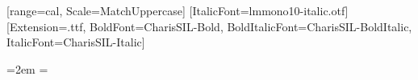 \usepackage[sups,otfmath]{XCharter} %
[range=cal, Scale=MatchUppercase] %
\setmonofont{lmmono10-regular.otf}[ItalicFont=lmmono10-italic.otf]%
\setsansfont[Ligatures=TeX, BoldFont=SourceSansPro-Bold, BoldItalicFont=SourceSansPro-BoldIt]{SourceSansPro-Regular}%
\newfontfamily{}[Extension=.ttf, BoldFont=CharisSIL-Bold, BoldItalicFont=CharisSIL-BoldItalic, ItalicFont=CharisSIL-Italic] %
\usepackage[babel=true]{microtype}  %



\oneandonehalfspacing
\renewcommand{\arraystretch}{1.2}


\frenchspacing

\emergencystretch=2em
\hfuzz=0.3pt
\vfuzz=\hfuzz
\raggedbottom

%
%

\newtheorem{thm}{Theorem}[chapter]
\newtheorem{cor}[thm]{Corollary}
\newtheorem{lem}[thm]{Lemma}
\newtheorem{prop}[thm]{Proposition}
\newtheorem{ax}{Axiom}

\theoremstyle{definition}
\newtheorem{defn}{Definition}[chapter]

\theoremstyle{remark}
\newtheorem{rem}{Remark}[chapter]
\newtheorem*{notation}{Notation}

\allowdisplaybreaks[0]


